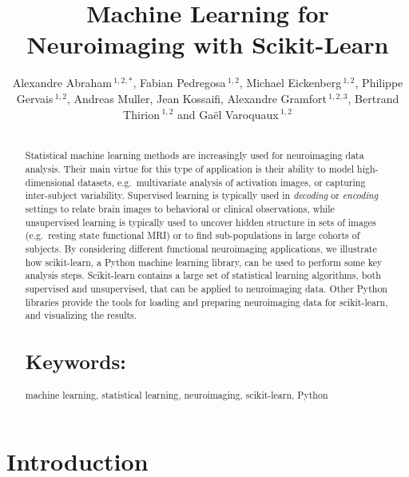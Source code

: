 \documentclass{frontiersSCNS} %
\def\firstAuthorLast{Alexandre Abraham {et~al}} %
\def\Authors{
    Alexandre Abraham\,$^{1,2,*}$,
    Fabian Pedregosa\,$^{1,2}$,
    Michael Eickenberg\,$^{1,2}$,
    Philippe Gervais\,$^{1,2}$,
    Andreas Muller,
    Jean Kossaifi,
    Alexandre Gramfort\,$^{1,2,3}$,
    Bertrand Thirion\,$^{1,2}$
    and Ga\"el Varoquaux\,$^{1,2}$}
\begin{document}
\onecolumn
{}

\title[Machine Learning for Neuroimaging with Scikit-Learn]{Machine Learning for Neuroimaging with Scikit-Learn}
\author[\firstAuthorLast ]{\Authors}
\address{}
\correspondance{}
\editor{}

\maketitle
\begin{abstract}

\section{}
Statistical machine learning methods are increasingly used for
neuroimaging data analysis. Their main virtue for this type of application
is their ability to model high-dimensional datasets, e.g.\ multivariate
analysis of activation images, or capturing inter-subject variability.
Supervised learning is typically used in \emph{decoding} or
\emph{encoding} settings to relate
brain images to behavioral or clinical observations, while
unsupervised learning is typically used to uncover hidden structure in
sets of images (e.g.\ resting state functional MRI) or to find
sub-populations in large cohorts of subjects. By considering
different functional neuroimaging applications, we illustrate how scikit-learn,
a Python machine learning library, can be used to perform some key
analysis steps. Scikit-learn contains a large set of statistical
learning algorithms, both supervised and unsupervised, that can be applied
to neuroimaging data. Other Python libraries provide the tools for
loading and preparing neuroimaging data for scikit-learn, and visualizing
the results.


\tiny
\section{Keywords:} machine learning, statistical learning, neuroimaging,
scikit-learn, Python
\end{abstract}


\section{Introduction}
\end{document}
